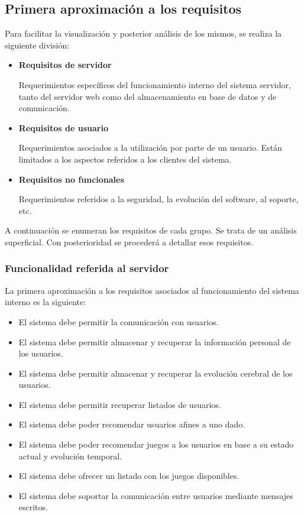 \subsection{Primera aproximación a los requisitos}

Para facilitar la visualización y posterior análisis de los mismos, se realiza la siguiente división:

\begin{itemize}
\item {\bf Requisitos de servidor}

  Requerimientos específicos del funcionamiento interno del sistema servidor, tanto del servidor web como del almacenamiento en base de datos y de comunicación.

\item {\bf Requisitos de usuario}

  Requerimientos asociados a la utilización por parte de un usuario. Están limitados a los aspectos referidos a los clientes del sistema.

\item {\bf Requisitos no funcionales}

  Requerimientos referidos a la seguridad, la evolución del software, al soporte, etc.


\end{itemize}

A continuación se enumeran los requisitos de cada grupo. Se trata de un análisis superficial. Con posterioridad se procederá a detallar esos requisitos.

\subsubsection{Funcionalidad referida al servidor}

La primera aproximación a los requisitos asociados al funcionamiento del sistema interno es la siguiente:

\begin{itemize}
\item El sistema debe permitir la comunicación con usuarios.
\item El sistema debe permitir almacenar y recuperar la información personal de los usuarios.
\item El sistema debe permitir almacenar y recuperar la evolución cerebral de los usuarios.
\item El sistema debe permitir recuperar listados de usuarios.
\item El sistema debe poder recomendar usuarios afines a uno dado.
\item El sistema debe poder recomendar juegos a los usuarios en base a su estado actual y evolución temporal.
\item El sistema debe ofrecer un listado con los juegos disponibles.
\item El sistema debe soportar la comunicación entre usuarios mediante mensajes escritos.
\end{itemize}


